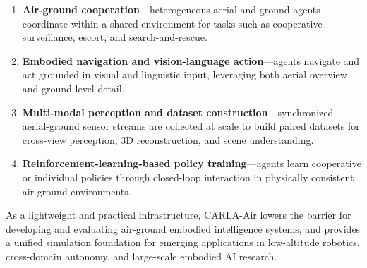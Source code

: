 \begin{enumerate}[leftmargin=*, label=(\alph*)]

\item \textbf{Air-ground cooperation}---heterogeneous aerial and ground agents
coordinate within a shared environment for tasks such as cooperative
surveillance, escort, and search-and-rescue.

\item \textbf{Embodied navigation and vision-language action}---agents navigate
and act grounded in visual and linguistic input, leveraging both aerial
overview and ground-level detail.

\item \textbf{Multi-modal perception and dataset construction}---synchronized
aerial-ground sensor streams are collected at scale to build paired datasets
for cross-view perception, 3D reconstruction, and scene understanding.

\item \textbf{Reinforcement-learning-based policy training}---agents learn
cooperative or individual policies through closed-loop interaction in
physically consistent air-ground environments.

\end{enumerate}

\noindent As a lightweight and practical infrastructure, CARLA-Air lowers the
barrier for developing and evaluating air-ground embodied intelligence systems,
and provides a unified simulation foundation for emerging applications in
low-altitude robotics, cross-domain autonomy, and large-scale embodied AI
research.

